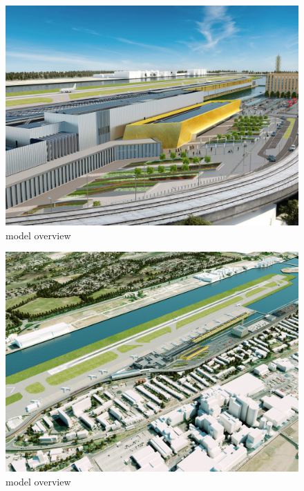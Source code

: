 \documentclass[
]{article}
\begin{document}
\begin{figure}[H]

{\centering \includegraphics{assets/PAW/London-City-Airport-Pascall-Watson-(1).jpg}

}

\caption{model overview}

\end{figure}%
\begin{figure}[H]

{\centering \includegraphics{assets/PAW/London-City-Airport-Pascall-Watson.jpg}

}

\caption{model overview}

\end{figure}%
\end{document}
